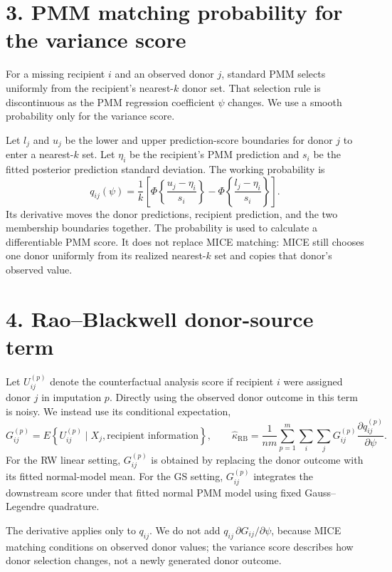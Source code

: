 \documentclass[11pt]{article}
\begin{document}
\section*{3. PMM matching probability for the variance score}
For a missing recipient $i$ and an observed donor $j$, standard PMM selects uniformly from the recipient's nearest-$k$ donor set. That selection rule is discontinuous as the PMM regression coefficient $\psi$ changes. We use a smooth probability only for the variance score.

Let $l_j$ and $u_j$ be the lower and upper prediction-score boundaries for donor $j$ to enter a nearest-$k$ set. Let $\eta_i$ be the recipient's PMM prediction and $s_i$ be the fitted posterior prediction standard deviation. The working probability is
\[
 q_{ij}(\psi) = \frac{1}{k}\left[
 \Phi\left\{\frac{u_j-\eta_i}{s_i}\right\} -
 \Phi\left\{\frac{l_j-\eta_i}{s_i}\right\}
 \right].
\]
Its derivative moves the donor predictions, recipient prediction, and the two membership boundaries together. The probability is used to calculate a differentiable PMM score. It does not replace MICE matching: MICE still chooses one donor uniformly from its realized nearest-$k$ set and copies that donor's observed value.

\section*{4. Rao--Blackwell donor-source term}
Let $U_{ij}^{(p)}$ denote the counterfactual analysis score if recipient $i$ were assigned donor $j$ in imputation $p$. Directly using the observed donor outcome in this term is noisy. We instead use its conditional expectation,
\[
 G_{ij}^{(p)} = E\left\{U_{ij}^{(p)} \mid X_j, \text{recipient information}\right\},
 \qquad
 \widehat{\kappa}_{\mathrm{RB}} = \frac{1}{nm}\sum_{p=1}^m\sum_i\sum_j
 G_{ij}^{(p)}\frac{\partial q_{ij}^{(p)}}{\partial\psi}.
\]
For the RW linear setting, $G_{ij}^{(p)}$ is obtained by replacing the donor outcome with its fitted normal-model mean. For the GS setting, $G_{ij}^{(p)}$ integrates the downstream score under that fitted normal PMM model using fixed Gauss--Legendre quadrature.

The derivative applies only to $q_{ij}$. We do not add $q_{ij}\,\partial G_{ij}/\partial\psi$, because MICE matching conditions on observed donor values; the variance score describes how donor selection changes, not a newly generated donor outcome.
\clearpage
\end{document}
